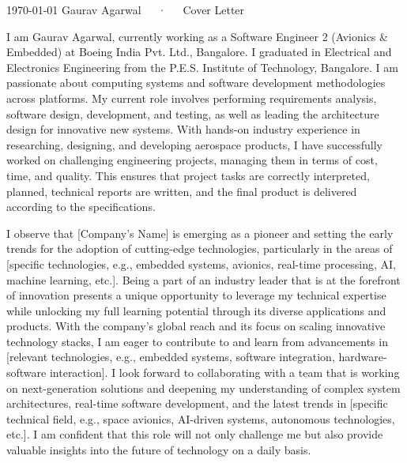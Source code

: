 \documentclass[11pt, a4paper]{awesome-cv}
\begin{document}
\makecvheader[R]

\makecvfooter
  {\today}
  {Gaurav Agarwal~~~·~~~Cover Letter}
  {}

\makelettertitle

\begin{cvletter}


    \large I am Gaurav Agarwal, currently working as a Software Engineer 2 (Avionics \& Embedded) at Boeing India Pvt. Ltd., Bangalore. I graduated in Electrical and Electronics Engineering from the P.E.S. Institute of Technology, Bangalore. I am passionate about computing systems and software development methodologies across platforms. My current role involves performing requirements analysis, software design, development, and testing, as well as leading the architecture design for innovative new systems. With hands-on industry experience in researching, designing, and developing aerospace products, I have successfully worked on challenging engineering projects, managing them in terms of cost, time, and quality. This ensures that project tasks are correctly interpreted, planned, technical reports are written, and the final product is delivered according to the specifications.


    \large I observe that [Company's Name] is emerging as a pioneer and setting the early trends for the adoption of cutting-edge technologies, particularly in the areas of [specific technologies, e.g., embedded systems, avionics, real-time processing, AI, machine learning, etc.]. Being a part of an industry leader that is at the forefront of innovation presents a unique opportunity to leverage my technical expertise while unlocking my full learning potential through its diverse applications and products. With the company's global reach and its focus on scaling innovative technology stacks, I am eager to contribute to and learn from advancements in [relevant technologies, e.g., embedded systems, software integration, hardware-software interaction]. I look forward to collaborating with a team that is working on next-generation solutions and deepening my understanding of complex system architectures, real-time software development, and the latest trends in [specific technical field, e.g., space avionics, AI-driven systems, autonomous technologies, etc.]. I am confident that this role will not only challenge me but also provide valuable insights into the future of technology on a daily basis.


\end{cvletter}
\end{document}
